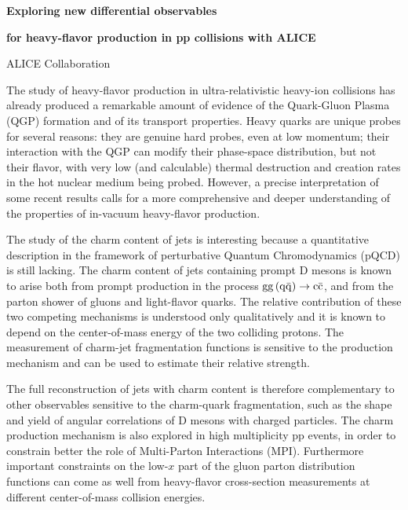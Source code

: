 \documentclass[12pt]{article}
\begin{document}
\centerline{\bf 
Exploring new differential observables
}

\centerline{\bf 
for heavy-flavor production in pp collisions with ALICE
}

\vspace{12pt}

\centerline{ALICE Collaboration }



\vspace{12pt}


\vspace{12pt} \vspace{12pt}
The study of heavy-flavor production in ultra-relativistic heavy-ion collisions has already produced
a remarkable amount of evidence of the Quark-Gluon Plasma (QGP) formation and of its transport properties. 
Heavy quarks are unique probes for several reasons: they are genuine hard probes, even at low momentum;
their interaction with the QGP can modify their phase-space distribution, but not their flavor, with very low
(and calculable) thermal destruction and creation rates in the hot nuclear medium being probed.
However, a precise interpretation of some recent results calls for a more comprehensive and deeper understanding
of the properties of in-vacuum heavy-flavor production.

The study of the charm content of jets is interesting because 
a quantitative description in the framework of perturbative
Quantum Chromodynamics (pQCD) is still lacking.
The charm content of jets containing prompt D mesons is known to arise both from prompt production 
in the process ${\rm gg\, (q\bar{q})} \rightarrow {\rm c\bar{c}}$, and
from the parton shower of gluons and light-flavor quarks.
The relative contribution of these two competing mechanisms is understood only qualitatively
and it is known to depend on the center-of-mass energy of the two colliding protons.
The measurement of charm-jet fragmentation functions is sensitive to the production mechanism and 
can be used to estimate their relative strength.

The full reconstruction of jets with charm content is therefore complementary to other observables sensitive to the charm-quark fragmentation, 
such as the shape and yield of angular correlations of D mesons with
charged particles. The charm production mechanism is also explored in high multiplicity pp events,
in order to constrain better the role of Multi-Parton Interactions (MPI).
Furthermore important constraints on the low-$x$ part of the gluon parton distribution functions can come
as well from heavy-flavor cross-section measurements at different center-of-mass collision energies.
\end{document}
